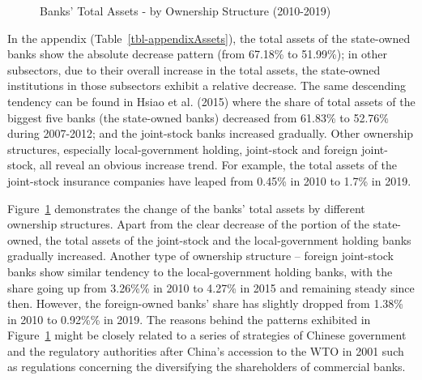 \documentclass[
  12pt,
  a4paper,
]{scrreprt}
\begin{document}
\begin{figure}


\caption{\label{fig-AssetsOwnership}Banks' Total Assets - by Ownership
Structure (2010-2019)}

\end{figure}%

In the appendix (Table~\ref{tbl-appendixAssets}), the total assets of
the state-owned banks show the absolute decrease pattern (from 67.18\%
to 51.99\%); in other subsectors, due to their overall increase in the
total assets, the state-owned institutions in those subsectors exhibit a
relative decrease. The same descending tendency can be found in Hsiao et
al. (2015) where the share of total assets of the biggest five banks
(the state-owned banks) decreased from 61.83\% to 52.76\% during
2007-2012; and the joint-stock banks increased gradually. Other
ownership structures, especially local-government holding, joint-stock
and foreign joint-stock, all reveal an obvious increase trend. For
example, the total assets of the joint-stock insurance companies have
leaped from 0.45\% in 2010 to 1.7\% in 2019.

Figure~\ref{fig-AssetsOwnership} demonstrates the change of the banks'
total assets by different ownership structures. Apart from the clear
decrease of the portion of the state-owned, the total assets of the
joint-stock and the local-government holding banks gradually increased.
Another type of ownership structure -- foreign joint-stock banks show
similar tendency to the local-government holding banks, with the share
going up from 3.26\%\% in 2010 to 4.27\% in 2015 and remaining steady
since then. However, the foreign-owned banks' share has slightly dropped
from 1.38\% in 2010 to 0.92\%\% in 2019. The reasons behind the patterns
exhibited in Figure~\ref{fig-AssetsOwnership} might be closely related
to a series of strategies of Chinese government and the regulatory
authorities after China's accession to the WTO in 2001 such as
regulations concerning the diversifying the shareholders of commercial
banks.
\end{document}
